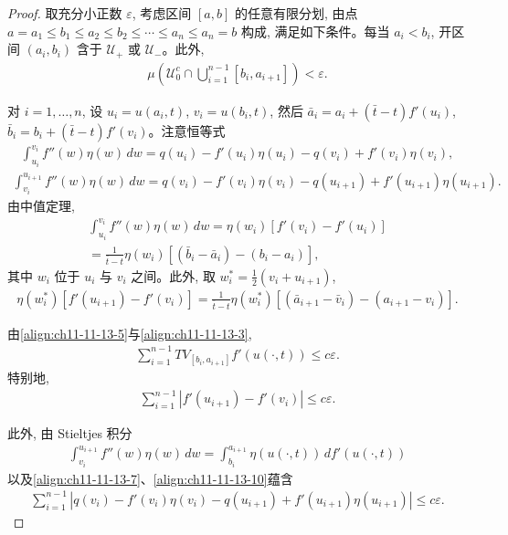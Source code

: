 \documentclass[../../main.tex]{subfiles}
\begin{document}
\begin{proof}
取充分小正数 $\varepsilon$, 考虑区间 $[a,b]$ 的任意有限分划, 由点 $a=a_1\leqslant b_1\leqslant a_2\leqslant b_2\leqslant\cdots\leqslant a_n\leqslant a_n=b$ 构成, 满足如下条件。每当 $a_i<b_i$, 开区间 $(a_i,b_i)$ 含于 $\mathscr{U}_+$ 或 $\mathscr{U}_-$。此外,
\begin{align}
\mu\left(\mathscr{U}_0^c\cap\bigcup_{i=1}^{n-1}[b_i,a_{i+1}]\right)<\varepsilon.\label{align:ch11-11-13-5}
\end{align}

对 $i=1,\ldots,n$, 设 $u_i=u(a_i,t)$, $v_i=u(b_i,t)$, 然后 $\bar a_i=a_i+(\bar t-t)f'(u_i)$, $\bar b_i=b_i+(\bar t-t)f'(v_i)$。注意恒等式
\begin{align}
\int_{u_i}^{v_i}f''(w)\eta(w)\,dw=q(u_i)-f'(u_i)\eta(u_i)-q(v_i)+f'(v_i)\eta(v_i),\label{align:ch11-11-13-6}
\end{align}
\begin{align}
\int_{v_i}^{u_{i+1}}f''(w)\eta(w)\,dw=q(v_i)-f'(v_i)\eta(v_i)-q(u_{i+1})+f'(u_{i+1})\eta(u_{i+1}).\label{align:ch11-11-13-7}
\end{align}
由中值定理,
\begin{align}
\int_{u_i}^{v_i}f''(w)\eta(w)\,dw=\eta(w_i)[f'(v_i)-f'(u_i)]\nonumber\\
=\frac{1}{\bar t-t}\eta(w_i)[(\bar b_i-\bar a_i)-(b_i-a_i)],\label{align:ch11-11-13-8}
\end{align}
其中 $w_i$ 位于 $u_i$ 与 $v_i$ 之间。此外, 取 $w_i^*=\frac12(v_i+u_{i+1})$,
\begin{align}
\eta(w_i^*)[f'(u_{i+1})-f'(v_i)]=\frac{1}{\bar t-t}\eta(w_i^*)[(\bar a_{i+1}-\bar v_i)-(a_{i+1}-v_i)].\label{align:ch11-11-13-9}
\end{align}

由\eqref{align:ch11-11-13-5}与\eqref{align:ch11-11-13-3},
\begin{align}
\sum_{i=1}^{n-1}TV_{[b_i,a_{i+1}]}f'(u(\cdot,t))\leqslant c\varepsilon.\label{align:ch11-11-13-10}
\end{align}
特别地,
\begin{align}
\sum_{i=1}^{n-1}|f'(u_{i+1})-f'(v_i)|\leqslant c\varepsilon.\label{align:ch11-11-13-11}
\end{align}

此外, 由 Stieltjes 积分
\begin{align}
\int_{v_i}^{u_{i+1}}f''(w)\eta(w)\,dw=\int_{b_i}^{a_{i+1}}\eta(u(\cdot,t))\,df'(u(\cdot,t))\label{align:ch11-11-13-12}
\end{align}
以及\eqref{align:ch11-11-13-7}、\eqref{align:ch11-11-13-10}蕴含
\begin{align}
\sum_{i=1}^{n-1}|q(v_i)-f'(v_i)\eta(v_i)-q(u_{i+1})+f'(u_{i+1})\eta(u_{i+1})|\leqslant c\varepsilon.\label{align:ch11-11-13-13}
\end{align}


\end{proof}
\end{document}

